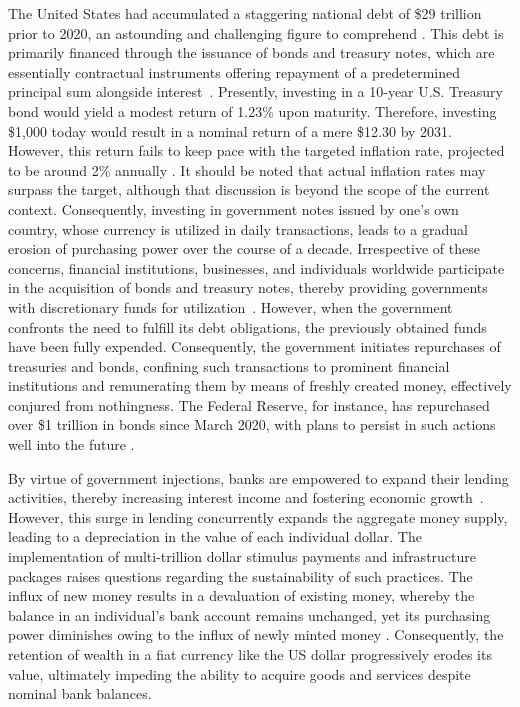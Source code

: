 The United States had accumulated a staggering national debt of \$29 trillion prior to 2020, an astounding and challenging figure to comprehend
\cite{usdebt}. This debt is primarily financed through the issuance of bonds and treasury notes, which are essentially contractual instruments
offering repayment of a predetermined principal sum alongside interest~\cite{treasurysecurities}. Presently, investing in a 10-year U.S.
Treasury bond would yield a modest return of 1.23\% upon maturity. Therefore, investing \$1,000 today would result in a nominal return of a
mere \$12.30 by 2031. However, this return fails to keep pace with the targeted inflation rate, projected to be around 2\% annually
\cite{frbinflation}. It should be noted that actual inflation rates may surpass the target, although that discussion is beyond the scope of the
current context. Consequently, investing in government notes issued by one's own country, whose currency is utilized in daily transactions,
leads to a gradual erosion of purchasing power over the course of a decade. Irrespective of these concerns, financial institutions, businesses,
and individuals worldwide participate in the acquisition of bonds and treasury notes, thereby providing governments with discretionary funds
for utilization~\cite{treasurysecurities}. However, when the government confronts the need to fulfill its debt obligations, the previously
obtained funds have been fully expended. Consequently, the government initiates repurchases of treasuries and bonds, confining such transactions
to prominent financial institutions and remunerating them by means of freshly created money, effectively conjured from nothingness. The Federal
Reserve, for instance, has repurchased over \$1 trillion in bonds since March 2020, with plans to persist in such actions well into the future
\cite{federalreserve}.

By virtue of government injections, banks are empowered to expand their lending activities, thereby increasing interest income and fostering
economic growth~\cite{federalreserve}. However, this surge in lending concurrently expands the aggregate money supply, leading to a depreciation
in the value of each individual dollar. The implementation of multi-trillion dollar stimulus payments and infrastructure packages raises questions
regarding the sustainability of such practices. The influx of new money results in a devaluation of existing money, whereby the balance in an
individual's bank account remains unchanged, yet its purchasing power diminishes owing to the influx of newly minted money
\cite{currencydevaluation}. Consequently, the retention of wealth in a fiat currency like the US dollar progressively erodes its value,
ultimately impeding the ability to acquire goods and services despite nominal bank balances.

